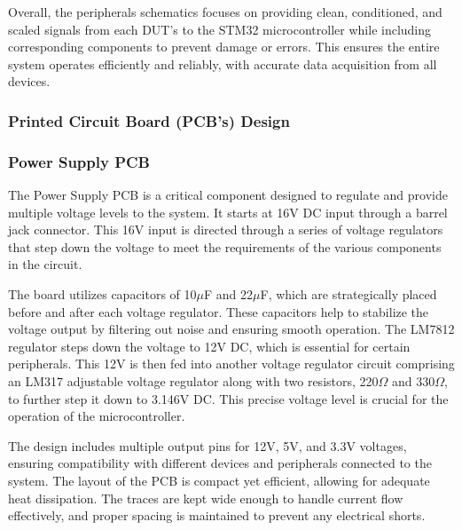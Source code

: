 \documentclass[12pt]{article}
\begin{document}
Overall, the peripherals schematics focuses on providing clean, conditioned, and scaled signals from each DUT’s to the STM32 microcontroller while including corresponding components to prevent damage or errors. This ensures the entire system operates efficiently and reliably, with accurate data acquisition from all devices.

\subsubsection{Printed Circuit Board (PCB’s) Design}
\subsubsection*{Power Supply PCB}
The Power Supply PCB is a critical component designed to regulate and provide
multiple voltage levels to the system. It starts at 16V DC input through a
barrel jack connector. This 16V input is directed through a series of voltage
regulators that step down the voltage to meet the requirements of the various
components in the circuit.

The board utilizes capacitors of 10$\mu$F and 22$\mu$F, which are strategically placed
before and after each voltage regulator. These capacitors help to stabilize the
voltage output by filtering out noise and ensuring smooth operation. The LM7812
regulator steps down the voltage to 12V DC, which is essential for certain
peripherals. This 12V is then fed into another voltage regulator circuit
comprising an LM317 adjustable voltage regulator along with two resistors, 220$\Omega$
and 330$\Omega$, to further step it down to 3.146V DC. This precise voltage level is
crucial for the operation of the microcontroller.


The design includes multiple output pins for 12V, 5V, and 3.3V voltages,
ensuring compatibility with different devices and peripherals connected to the
system. The layout of the PCB is compact yet efficient, allowing for adequate
heat dissipation. The traces are kept wide enough to handle current flow
effectively, and proper spacing is maintained to prevent any electrical shorts.
\end{document}
